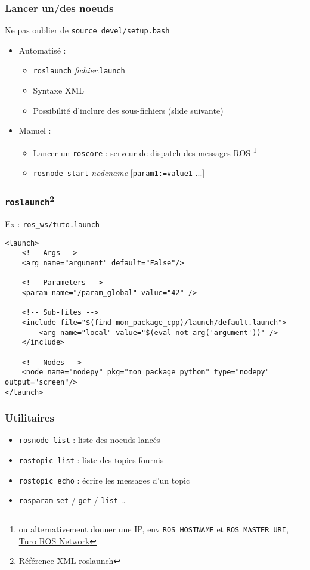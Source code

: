 \documentclass{beamer}
\begin{document}
\begin{frame}
\frametitle{Lancer un/des noeuds}
Ne pas oublier de \texttt{source devel/setup.bash}
\begin{itemize}
    \item Automatisé : \begin{itemize}
        \item \texttt{roslaunch} \textit{fichier}.\texttt{launch}
        \item Syntaxe XML
        \item Possibilité d'inclure des sous-fichiers (slide suivante)
    \end{itemize}
    \item Manuel : \begin{itemize}
        \item Lancer un \texttt{roscore} : serveur de dispatch des messages ROS \footnote{ou
        alternativement donner une IP, env \texttt{ROS\_HOSTNAME} et \texttt{ROS\_MASTER\_URI},
        \href{http://wiki.ros.org/ROS/NetworkSetup}{Turo ROS Network}}
        \item \texttt{rosnode start} \textit{nodename} [\texttt{param1:=value1} ...]
    \end{itemize}
\end{itemize}
\end{frame}

\begin{frame}[fragile]
\frametitle{\texttt{roslaunch}\footnote{\href{http://wiki.ros.org/roslaunch/XML
}{Référence XML roslaunch}}}
Ex : \texttt{ros\_ws/tuto.launch}

\begin{verbatim}
<launch>
    <!-- Args -->
    <arg name="argument" default="False"/>

    <!-- Parameters -->
    <param name="/param_global" value="42" />

    <!-- Sub-files -->
    <include file="$(find mon_package_cpp)/launch/default.launch">
        <arg name="local" value="$(eval not arg('argument'))" />
    </include>

    <!-- Nodes -->
    <node name="nodepy" pkg="mon_package_python" type="nodepy" output="screen"/>
</launch>
\end{verbatim}
\end{frame}


\begin{frame}
\frametitle{Utilitaires}
\begin{itemize}
    \item \texttt{rosnode list} : liste des noeuds lancés
    \item \texttt{rostopic list} : liste des topics fournis
    \item \texttt{rostopic echo} : écrire les messages d'un topic
    \item \texttt{rosparam} \texttt{set} / \texttt{get} / \texttt{list} ..
\end{itemize}
\end{frame}
\end{document}
